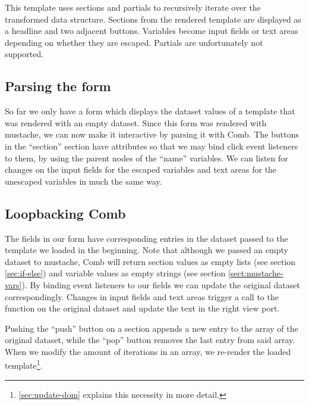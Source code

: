 \documentclass[thesis.tex]{subfiles}
\begin{document}
This template uses sections and partials to recursively iterate over the
transformed data structure.
Sections from the rendered template are displayed as a headline and two adjacent
buttons.
Variables become input fields or text areas depending on whether they are
escaped.
Partials are unfortunately not supported.

\subsection{Parsing the form}
So far we only have a form which displays the dataset values of a template that
was rendered with an empty dataset.
Since this form was rendered with mustache, we can now make it interactive by
parsing it with Comb. The buttons in the ``section'' section have
 attributes so that we may bind click event listeners to
them, by using the parent nodes of the ``name'' variables. We can listen
for changes on the input fields for the escaped variables and text areas for the
unescaped variables in much the same way.

\subsection{Loopbacking Comb}
\label{sec:loopbacking}
The fields in our form have corresponding entries in the dataset passed to
the template we loaded in the beginning.
Note that although we passed an empty dataset to mustache, Comb will return
section values as empty lists (see section \ref{sec:if-else}) and
variable values as empty strings (see section \ref{sect:mustache-vars}).
By binding event listeners to our fields we can update the original dataset
correspondingly. Changes in input fields and text areas trigger a call to the
 function on the original dataset and update the text in the
right view port.

Pushing the ``push'' button on a section appends a new entry to the array of the
original dataset, while the ``pop'' button removes the last entry from said array.
When we modify the amount of iterations in an array, we re-render the loaded
template\footnote{
	\ref{sec:update-dom} explains this necessity in more detail.
}.
\end{document}
